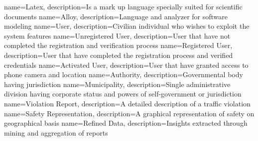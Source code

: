 


{
    name=Latex,
    description={Is a mark up language specially suited for scientific documents}
}
{
    name=Alloy,
    description={Language and analyzer for software modeling}
}
{
    name=User,
    description={Civilian individual who wishes to exploit the system features}
}
{
    name=Unregistered User,
    description={User that have not completed the registration and verification process}
}
{
    name=Registered User,
    description={User that have completed the registration process and verified credentials}
}
{
    name=Activated User,
    description={User that have granted access to phone camera and location}
}
{
    name=Authority,
    description={Governmental body having jurisdiction}
}
{
    name=Municipality,
    description={Single administrative division having corporate status and powers of self-government or jurisdiction}
}
{
    name=Violation Report,
    description={A detailed description of a traffic violation}
}
{
    name=Safety Representation,
    description={A graphical representation of safety on geographical basis}
}
{
    name=Refined Data,
    description={Insights extracted through mining and aggregation of reports}
}

